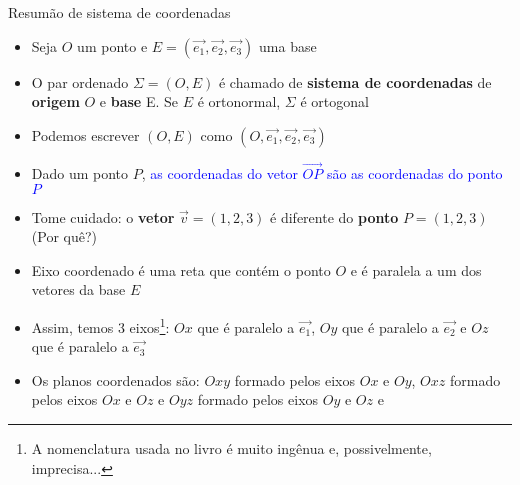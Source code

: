 \begin{frame}{Resumão de sistema de coordenadas}
    \begin{itemize}
        \item Seja \(O\) um ponto e \(E=(\vec{e_1},\vec{e_2},\vec{e_3})\) uma base
        \item O par ordenado \(\Sigma = (O,E)\) é chamado de \textbf{sistema de coordenadas} de \textbf{origem} 
            \(O\) e \textbf{base} E. Se \(E\) é ortonormal, \(\Sigma\) é ortogonal
        \item Podemos escrever \((O,E)\) como \((O,\vec{e_1},\vec{e_2},\vec{e_3})\)
        \item Dado um ponto \(P\), \textcolor{blue}{as coordenadas do vetor \(\vec{OP}\) são as coordenadas do ponto \(P\)}
        \item Tome cuidado: o \textbf{vetor} \(\vec{v}=(1,2,3)\) é diferente do \textbf{ponto} \(P=(1,2,3)\) \alert{(Por quê?)}
        \item Eixo coordenado é uma reta que contém o ponto \(O\) e é paralela a um dos vetores da base \(E\)
        \item Assim, temos 3 eixos\footnote{A nomenclatura usada no livro é muito ingênua e, possivelmente, imprecisa...}:
            \(Ox\) que é paralelo a \(\vec{e_1}\), \(Oy\) que é paralelo a \(\vec{e_2}\) e \(Oz\) que é paralelo a \(\vec{e_3}\)
        \item Os planos coordenados são: \(Oxy\) formado pelos eixos \(Ox\) e \(Oy\), 
            \(Oxz\) formado pelos eixos \(Ox\) e \(Oz\) e
            \(Oyz\) formado pelos eixos \(Oy\) e \(Oz\) e
    \end{itemize}
\end{frame}


